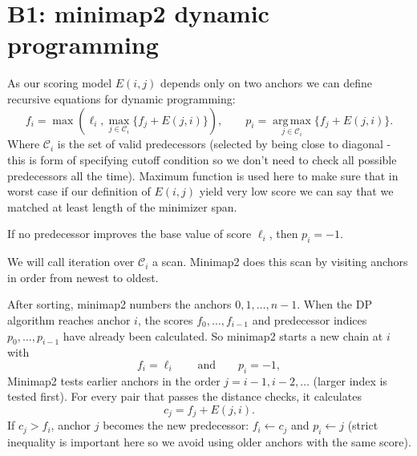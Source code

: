 \section{B1: minimap2 dynamic programming}
\label{sec:chaining-b1}

As our scoring model $E(i,j)$ depends only on two anchors we can define recursive equations for dynamic programming:
\begin{equation}
 f_i=\max\!\left(
   \ell_i,
   \max_{j\in\mathcal{C}_i}\{f_j+E(j,i)\}
 \right),
 \qquad
 p_i=\operatorname*{arg\,max}_{j\in\mathcal{C}_i}\{f_j+E(j,i)\}.
\label{eq:chaining-b1-recurrence}
\end{equation}
Where $\mathcal{C}_i$ is the set of valid predecessors (selected by being close to diagonal - this is form of specifying cutoff condition so we don't need to check all possible predecessors all the time).
Maximum function is used here to make sure that in worst case if our definition of $E(i,j)$ yield very low score we can say that we matched at least length of the minimizer span.

If no predecessor improves the base value of score \(\ell_i\), then
\(p_i=-1\).

We will call iteration over $\mathcal{C}_i$ a scan. Minimap2 does this scan by visiting anchors in order from newest to oldest.

After sorting, minimap2 numbers the anchors \(0,1,\ldots,n-1\). When the DP algorithm
reaches anchor \(i\), the scores \(f_0,\ldots,f_{i-1}\) and predecessor
indices \(p_0,\ldots,p_{i-1}\) have already been calculated. So minimap2 starts a new
chain at \(i\) with
\[
  f_i=\ell_i \qquad\text{and}\qquad p_i=-1,
\]
Minimap2 tests earlier anchors in the order \(j=i-1,i-2,\ldots\) (larger
index is tested first). For every pair that passes the distance checks, it
calculates
\[
  c_j=f_j+E(j,i).
\]
If \(c_j>f_i\), anchor \(j\) becomes the new predecessor:
\(f_i\gets c_j\) and \(p_i\gets j\) (strict inequality is important here so we avoid using older anchors with the same score).

